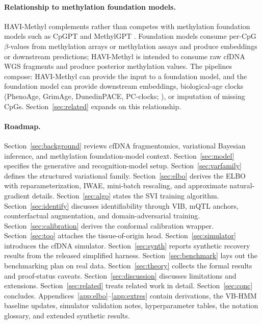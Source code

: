 \paragraph{Relationship to methylation foundation models.} HAVI-Methyl complements rather than competes with methylation foundation models such as CpGPT \citep{cpgpt2024} and MethylGPT \citep{methylgpt2024}. Foundation models consume per-CpG $\beta$-values from methylation arrays or methylation assays and produce embeddings or downstream predictions; HAVI-Methyl is intended to consume raw cfDNA WGS fragments and produce posterior methylation values. The pipelines compose: HAVI-Methyl can provide the input to a foundation model, and the foundation model can provide downstream embeddings, biological-age clocks (PhenoAge, GrimAge, DunedinPACE, PC-clocks; \citealp{horvath2013,levine2018phenoage,lu2019grimage,belsky2022dunedinpace,higginschen2022pcclocks}), or imputation of missing CpGs. Section~\ref{sec:related} expands on this relationship.

\paragraph{Roadmap.} Section~\ref{sec:background} reviews cfDNA fragmentomics, variational Bayesian inference, and methylation foundation-model context. Section~\ref{sec:model} specifies the generative and recognition-model setup. Section~\ref{sec:varfamily} defines the structured variational family. Section~\ref{sec:elbo} derives the ELBO with reparameterization, IWAE, mini-batch rescaling, and approximate natural-gradient details. Section~\ref{sec:algo} states the SVI training algorithm. Section~\ref{sec:identify} discusses identifiability through VIB, mQTL anchors, counterfactual augmentation, and domain-adversarial training. Section~\ref{sec:calibration} derives the conformal calibration wrapper. Section~\ref{sec:too} attaches the tissue-of-origin head. Section~\ref{sec:simulator} introduces the cfDNA simulator. Section~\ref{sec:synth} reports synthetic recovery results from the released simplified harness. Section~\ref{sec:benchmark} lays out the benchmarking plan on real data. Section~\ref{sec:theory} collects the formal results and proof-status caveats. Section~\ref{sec:discussion} discusses limitations and extensions. Section~\ref{sec:related} treats related work in detail. Section~\ref{sec:conc} concludes. Appendices~\ref{app:elbo}--\ref{app:extres} contain derivations, the VB-HMM baseline updates, simulator validation notes, hyperparameter tables, the notation glossary, and extended synthetic results.

